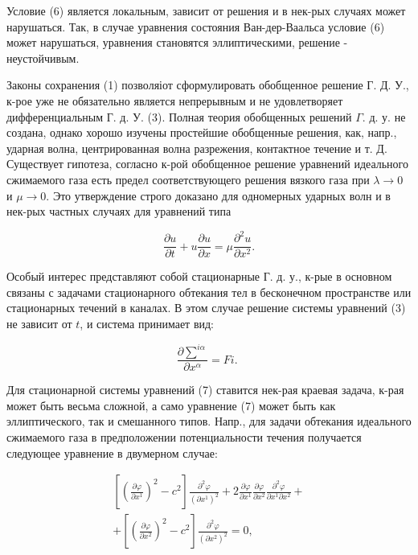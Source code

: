 \documentclass[10pt]{article}
\begin{document}
Условие (6) является локальным, зависит от решения и в нек-рых случаях может нарушаться. Так, в случае уравнения состояния Ван-дер-Ваальса условие (6) может нарушаться, уравнения становятся эллиптическими, решение - неустойчивым.



Законы сохранения (1) позволяіот сформулировать обобщенное решение Г. Д. У., к-рое уже не обязательно является непрерывным и не удовлетворяет дифференциальным Г. д. У. (3). Полная теория обобщенных решений $\Gamma$. д. у. не создана, однако хорошо изучены простейшие обобщенные решения, как, напр., ударная волна, центрированная волна разрежения, контактное течение и т. Д. Существует гипотеза, согласно к-рой обобщенное решение уравнений идеального сжимаемого газа есть предел соответствующего решения вязкого газа при $\lambda \rightarrow 0$ и $\mu \rightarrow 0$. Это утверждение строго доказано для одномерных ударных волн и в нек-рых частных случаях для уравнений типа



\[

\frac{\partial u}{\partial t}+u \frac{\partial u}{\partial x}=\mu \frac{\partial^{2} u}{\partial x^{2}} .

\]



Особый интерес представляют собой стационарные Г. д. у., к-рые в основном связаны с задачами стационарного обтекания тел в бесконечном пространстве или стационарных течений в каналах. В этом случае решение системы уравнений (3) не зависит от $t$, и система принимает вид:



\[

\frac{\partial \sum^{i \alpha}}{\partial x^{\alpha}}=F i \text {. }

\]



Для стационарной системы уравнений (7) ставится нек-рая краевая задача, к-рая может быть весьма сложной, а само уравнение (7) может быть как эллиптического, так и смешанного типов. Напр., для задачи обтекания идеального сжимаемого газа в предположении потенциальности течения получается следующее уравнение в двумерном случае:



\[

\begin{gathered}

{\left[\left(\frac{\partial \varphi}{\partial x^{1}}\right)^{2}-c^{2}\right] \frac{\partial^{2} \varphi}{\left(\partial x^{1}\right)^{2}}+2 \frac{\partial \varphi}{\partial x^{1}} \frac{\partial \varphi}{\partial x^{2}} \frac{\partial^{2} \varphi}{\partial x^{1} \partial x^{2}}+} \\

+\left[\left(\frac{\partial \varphi}{\partial x^{2}}\right)^{2}-c^{2}\right] \frac{\partial^{2} \varphi}{\left(\partial x^{2}\right)^{2}}=0,

\end{gathered}

\]
\end{document}
